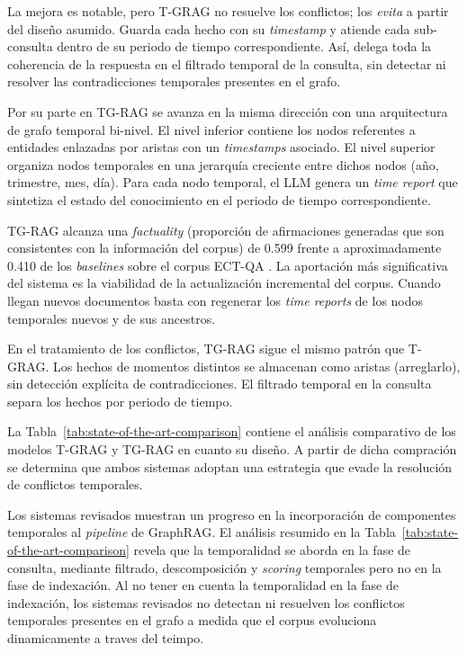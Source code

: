 La mejora es notable, pero T-GRAG no resuelve los conflictos; los \emph{evita} a partir del diseño asumido. Guarda cada hecho con su \emph{timestamp} y atiende cada sub-consulta dentro de su periodo de tiempo correspondiente. Así, delega toda la coherencia de la respuesta en el filtrado temporal de la consulta, sin detectar ni resolver las contradicciones temporales presentes en el grafo.

Por su parte en TG-RAG \cite{tg_rag2025} se avanza en la misma dirección con una arquitectura de grafo temporal bi-nivel. El nivel inferior contiene los nodos referentes a entidades enlazadas por aristas con un \emph{timestamps} asociado. El nivel superior organiza nodos temporales en una jerarquía creciente entre dichos nodos (año, trimestre, mes, día). Para cada nodo temporal, el LLM genera un \emph{time report} que sintetiza el estado del conocimiento en el periodo de tiempo correspondiente.

TG-RAG alcanza una \emph{factuality} (proporción de afirmaciones generadas que son consistentes con la información del corpus) de 0.599 frente a aproximadamente 0.410 de los \emph{baselines} sobre el corpus ECT-QA \cite{tg_rag2025}. La aportación más significativa del sistema es la viabilidad de la actualización incremental del corpus. Cuando llegan nuevos documentos basta con regenerar los \emph{time reports} de los nodos temporales nuevos y de sus ancestros. 

En el tratamiento de los conflictos, TG-RAG sigue el mismo patrón que T-GRAG. Los hechos de momentos distintos se almacenan como aristas (arreglarlo), sin detección explícita de contradicciones. El filtrado temporal en la consulta separa los hechos por periodo de tiempo.

La Tabla~\ref{tab:state-of-the-art-comparison} contiene el análisis comparativo de los modelos T-GRAG y TG-RAG en cuanto su diseño. A partir de dicha compración se determina que ambos sistemas adoptan una estrategia que evade la resolución de conflictos temporales.


Los sistemas revisados muestran un progreso en la incorporación de componentes temporales al \emph{pipeline} de GraphRAG. El análisis resumido en la Tabla~\ref{tab:state-of-the-art-comparison} revela que la temporalidad se aborda en la fase de consulta, mediante filtrado, descomposición y \emph{scoring} temporales pero no en la fase de indexación. Al no tener en cuenta la temporalidad en la fase de indexación, los sistemas revisados no detectan ni resuelven los conflictos temporales presentes en el grafo a medida que el corpus evoluciona dinamicamente a traves del teimpo.
